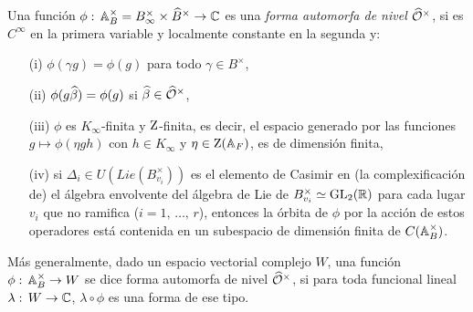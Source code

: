 \begin{defFormaAutomorfa}\label{def:formaautomorfa}
	Una funci\'{o}n
	\begin{math}
		\phi:\,\mathbb{A}_{B}^{\times}={B}_{\infty}^{\times}\times\widehat{B}^{\times}\rightarrow\mathbb{C}
	\end{math} es una \emph{forma automorfa de nivel $\widehat{\mathcal{O}}^{\times}$}, si
	es $C^{\infty}$ en la primera variable y localmente constante en la
	segunda y:
	\begin{itemize}
		\item[(i)] $\phi(\gamma g)=\phi(g)$ para todo
			$\gamma\in B^{\times}$,
		\item[(ii)] $\phi(g\widehat{\beta})=\phi(g)$ si
			$\widehat{\beta}\in\widehat{\mathcal{O}}^{\times}$,
		\item[(iii)] $\phi$ es $K_{\infty}$-finita y
			$\mathrm{Z}$-finita, es decir, el espacio generado por
			las funciones $g\mapsto\phi(\eta gh)$
			con $h\in K_{\infty}$ y $\eta\in\mathrm{Z}(\mathbb{A}_{F})$,
			es de dimensi\'{o}n finita,
		\item[(iv)] si
			\begin{math}
				\Delta_{i}\in U(\mathit{Lie}(
					B_{v_{i}}^{\times}))
			\end{math}
			es el elemento de Casimir en (la complexificaci\'{o}n
			de) el \'{a}lgebra envolvente del \'{a}lgebra de Lie de
			$B_{v_{i}}^{\times}\simeq\mathrm{GL}_{2}(\mathbb{R})$ para cada
			lugar $v_{i}$ que no ramifica ($i=1,\,\dots,\,r$),
			entonces la \'{o}rbita de $\phi$ por la acci\'{o}n de
			estos operadores est\'{a} contenida en un subespacio de
			dimensi\'{o}n finita de $C(\mathbb{A}_{B}^{\times})$.
	\end{itemize}
	M\'{a}s generalmente, dado un espacio vectorial complejo $W$,
	una funci\'{o}n $\phi:\,\mathbb{A}_{B}^{\times}\rightarrow W$ se dice
	forma automorfa de nivel $\widehat{\mathcal{O}}^{\times}$, si para toda funcional
	lineal $\lambda:\,W\rightarrow\mathbb{C}$, $\lambda\circ\phi$ es una
	forma de ese tipo.
\end{defFormaAutomorfa}

